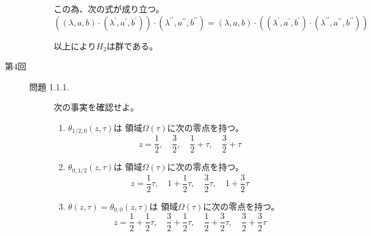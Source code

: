 \documentclass[12pt,b5paper]{ltjsarticle}
\begin{document}
\begin{description}
\begin{description}
             この為、次の式が成り立つ。
             \begin{equation}
              \left( (\lambda,a,b)\cdot (\lambda^{\prime},a^{\prime},b^{\prime})\right) \cdot (\lambda^{\prime\prime},a^{\prime\prime},b^{\prime\prime})
               =
               (\lambda,a,b)\cdot \left( (\lambda^{\prime},a^{\prime},b^{\prime}) \cdot (\lambda^{\prime\prime},a^{\prime\prime},b^{\prime\prime})\right)
             \end{equation}

             以上により$H_{2}$は群である。

\hrulefill

 \end{description}

 \item[第4回]
 \begin{description}
  \item[問題 1.1.1.]
             次の事実を確認せよ。
             \begin{enumerate}
              \item
                   $\theta_{1/2,0}(z,\tau)$は
                   領域$\Omega(\tau)$に次の零点を持つ。
                   \begin{equation}
                    z=\frac{1}{2},\quad
                     \frac{3}{2},\quad
                     \frac{1}{2}+\tau,\quad
                     \frac{3}{2}+\tau
                   \end{equation}

              \item
                   $\theta_{0,1/2}(z,\tau)$は
                   領域$\Omega(\tau)$に次の零点を持つ。
                   \begin{equation}
                    z=\frac{1}{2}\tau,\quad
                     1+\frac{1}{2}\tau,\quad
                     \frac{3}{2}\tau,\quad
                     1+\frac{3}{2}\tau
                   \end{equation}

              \item
                   $\theta(z,\tau)=\theta_{0,0}(z,\tau)$は
                   領域$\Omega(\tau)$に次の零点を持つ。
                   \begin{equation}
                    z=\frac{1}{2}+\frac{1}{2}\tau,\quad
                     \frac{3}{2}+\frac{1}{2}\tau,\quad
                     \frac{1}{2}+\frac{3}{2}\tau,\quad
                     \frac{3}{2}+\frac{3}{2}\tau
                   \end{equation}
             \end{enumerate}

\dotfill



\hrulefill

\end{description}

\end{description}

\hrulefill
\end{document}
